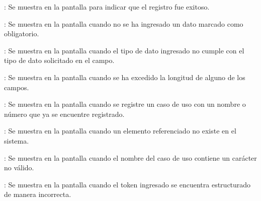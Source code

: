 \begin{Citemize}
	\item {}: Se muestra en la pantalla  para indicar que el registro fue exitoso.
	\item {}: Se muestra en la pantalla  cuando no se ha ingresado un dato marcado como obligatorio.
	\item {}: Se muestra en la pantalla  cuando el tipo de dato ingresado no cumple con el tipo de dato solicitado en el campo.
	\item {}: Se muestra en la pantalla  cuando se ha excedido la longitud de alguno de los campos.
	\item {}: Se muestra en la pantalla  cuando se registre un caso de uso con un nombre o número que ya se encuentre registrado.
	\item {}: Se muestra en la pantalla  cuando un elemento referenciado no existe en el sistema.
	\item {}: Se muestra en la pantalla  cuando el nombre del caso de uso contiene un carácter no válido.
	\item {}: Se muestra en la pantalla  cuando el token ingresado se encuentra estructurado de manera incorrecta.
\end{Citemize}
